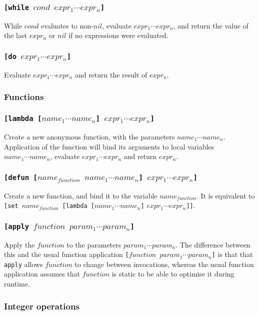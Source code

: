 \documentclass[11pt]{report}
\begin{document}
\subsubsection*{\tt{[while }$cond$ $expr_1 \cdots expr_n$\tt{]}}
While $cond$ evaluates to non-$nil$, evaluate $expr_1 \cdots expr_n$, and return the value of the last $expr_n$ or $nil$ if no expressions were evaluated.


\subsubsection*{\tt{[do }$expr_1 \cdots expr_n$\tt{]}}
Evaluate $expr_1 \cdots expr_n$ and return the result of $expr_n$.


\subsubsection{Functions}
\subsubsection*{\tt{[lambda [}$name_1 \cdots name_n$\tt{]} $expr_1 \cdots expr_n$\tt{]}}
Create a new anonymous function, with the parameters $name_1\cdots name_n$. Application of the function will bind its arguments to local variables $name_1\cdots name_n$, evaluate $expr_1\cdots expr_n$ and return $expr_n$.
\subsubsection*{\tt{[defun [}$name_{function}$ $name_1 \cdots name_n$\tt{]} $expr_1 \cdots expr_n$\tt{]}}
Create a new function, and bind it to the variable $name_{function}$. It is equivalent to {\tt{[set }}$name_{function}${\tt{ [lambda [}}$name_1 \cdots name_n${\tt{]}} $expr_1 \cdots expr_n${\tt{]]}}.

\subsubsection*{\tt{[apply }$function$ $param_1 \cdots param_n$\tt{]}}
Apply the $function$ to the parameters $param_1\cdots param_n$. The difference between this and the usual function application {\tt{[}$function$ $param_1\cdots param_n$\tt{]}} is that that \verb|apply| allows $function$ to change between invocations, whereas the usual function application assumes that $function$ is static to be able to optimise it during runtime.

\subsubsection{Integer operations}
\end{document}
